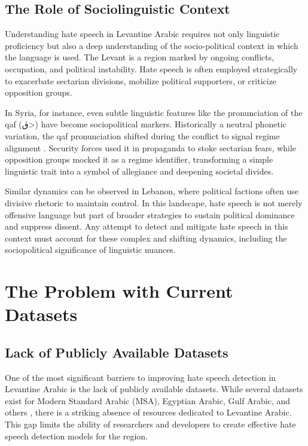 \documentclass[11pt]{article}
\begin{document}
\subsection{The Role of Sociolinguistic Context}

Understanding hate speech in Levantine Arabic requires not only linguistic proficiency but also a deep understanding of the socio-political context in which the language is used. The Levant is a region marked by ongoing conflicts, occupation, and political instability. Hate speech is often employed strategically to exacerbate sectarian divisions, mobilize political supporters, or criticize opposition groups.

In Syria, for instance, even subtle linguistic features like the pronunciation of the qaf (\<ق>) have become sociopolitical markers. Historically a neutral phonetic variation, the qaf pronunciation shifted during the conflict to signal regime alignment \citep{Omran_2021}. Security forces used it in propaganda to stoke sectarian fears, while opposition groups mocked it as a regime identifier, transforming a simple linguistic trait into a symbol of allegiance and deepening societal divides.

Similar dynamics can be observed in Lebanon, where political factions often use divisive rhetoric to maintain control. In this landscape, hate speech is not merely offensive language but part of broader strategies to sustain political dominance and suppress dissent. Any attempt to detect and mitigate hate speech in this context must account for these complex and shifting dynamics, including the sociopolitical significance of linguistic nuances.


\section{The Problem with Current Datasets}

\subsection{Lack of Publicly Available Datasets}

One of the most significant barriers to improving hate speech detection in Levantine Arabic is the lack of publicly available datasets. While several datasets exist for Modern Standard Arabic (MSA), Egyptian Arabic, Gulf Arabic, and others \citep{ALAKROT2018174, mubarak-etal-2017-abusive, 10.5555/3382225.3382239, 8593146}, there is a striking absence of resources dedicated to Levantine Arabic. This gap limits the ability of researchers and developers to create effective hate speech detection models for the region.
\end{document}
